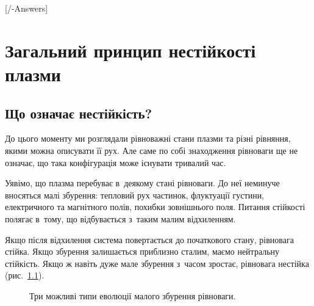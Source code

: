 

\graphicspath{{\currfilebase/Pictures}}

[\currfilebase/\currfilebase-Answers]
\chapter{Загальний принцип нестійкості плазми}\label{sec:instability}
\label{sec:plasma-instability}\hypertarget{plasma-instability}{}

\section{Що означає нестійкість?}

До цього моменту ми розглядали рівноважні стани плазми та різні
рівняння, якими можна описувати її рух. Але саме по собі знаходження
рівноваги ще не означає, що така конфігурація може існувати тривалий час.

Уявімо, що плазма перебуває в~деякому стані рівноваги. До неї неминуче
вносяться малі збурення: тепловий рух частинок, флуктуації густини,
електричного та магнітного полів, похибки зовнішнього поля. Питання
стійкості полягає в~тому, що відбувається з~таким малим відхиленням.

Якщо після відхилення система повертається до початкового стану,
рівновага стійка. Якщо збурення залишається приблизно сталим, маємо
нейтральну стійкість. Якщо ж навіть дуже мале збурення з~часом
зростає, рівновага нестійка (рис.~\ref{fig:instability-three-regimes}).

\begin{figure}[ht]
\centering
{}
\caption{Три можливі типи еволюції малого збурення рівноваги.}
\label{fig:instability-three-regimes}
\end{figure}

